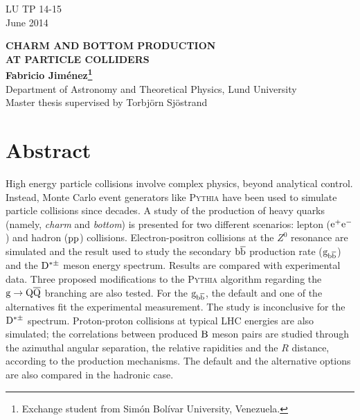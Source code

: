\documentclass[a4paper,12pt]{article}
\begin{document}
\begin{titlepage}
\begin{flushright}
LU TP 14-15\\
June 2014\\
\end{flushright}
\vfill
\begin{center}

{\large\bf CHARM AND BOTTOM PRODUCTION\\[3mm]
AT PARTICLE COLLIDERS}
\\[3cm]
{\bf Fabricio Jiménez\footnote{Exchange student from Simón Bolívar University, Venezuela.}}
\\[5mm]
{Department of Astronomy and Theoretical Physics, Lund University}
\\[2cm]
{Master thesis supervised by Torbjörn Sjöstrand}
\vfill
\section*{Abstract}
\end{center}
High energy particle collisions involve complex physics, beyond analytical control. Instead, Monte Carlo event generators like \textsc{Pythia} have been used to simulate particle collisions since decades. A study of the production of heavy quarks (namely, \textit{charm} and \textit{bottom}) is presented for two different scenarios: lepton (${\mathrm e}^+{\mathrm e}^-$) and hadron (${\mathrm p}{\mathrm p}$) collisions. Electron-positron collisions at the $Z^0$ resonance are simulated and the result used to study the secondary ${\mathrm b}\overline{\mathrm b}$ production rate (${\mathrm g}_{{\mathrm b}\overline{\mathrm b}}$) and the ${\mathrm D}^{*\pm}$ meson energy spectrum. Results are compared with experimental data. Three proposed modifications to the \textsc{Pythia} algorithm regarding the ${\mathrm g}\to{\mathrm Q}\overline{\mathrm Q}$ branching are also tested. For the ${\mathrm g}_{{\mathrm b}\overline{\mathrm b}}$, the default and one of the alternatives fit the experimental measurement. The study is inconclusive for the ${\mathrm D}^{*\pm}$ spectrum. Proton-proton collisions at typical LHC energies are also simulated; the correlations between produced ${\mathrm B}$ meson pairs are studied through the azimuthal angular separation, the relative rapidities and the $R$ distance, according to the production mechanisms. The default and the alternative options are also compared in the hadronic case.
\end{titlepage}
\end{document}
